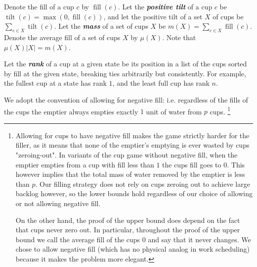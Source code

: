 \documentclass[twocolumn]{article}[10pt]
\newcommand{\defn}[1]{{\textit{\textbf{\boldmath #1}}}\xspace}
\DeclareMathOperator{\tilt}{\text{tilt}}
\DeclareMathOperator{\fil}{\text{fill}}
\begin{document}
Denote the fill of a cup $c$ by $\fil(c)$. Let the \defn{positive tilt} of a cup $c$ be
$\tilt(c) = \max(0, \fil(c))$, and let the positive tilt of a set $X$ of
cups be $\sum_{c\in X} \tilt(c)$. Let the \defn{mass} of a set of cups $X$
be $m(X) = \sum_{c\in X} \fil(c)$. Denote the average fill of a set of cups $X$
by $\mu(X)$. Note that $\mu(X) |X| = m(X)$.

Let the \defn{rank} of a cup at a given state be its position in a list of the
cups sorted by fill at the given state, breaking ties arbitrarily but
consistently. For example, the fullest cup at a state has rank $1$, and the
least full cup has rank $n$.

We adopt the convention of allowing for negative fill: i.e. regardless of the
fills of the cups the emptier always empties exactly $1$ unit of water from
$p$ cups. \footnote{
  Allowing for cups to have negative fill makes the game strictly harder for
  the filler, as it means that none of the emptier's emptying is ever wasted by
  cups "zeroing-out". In variants of the cup game without negative fill, when
  the emptier empties from a cup with fill less than $1$ the cups fill goes to
  $0$. This however implies that the total mass of water removed by the emptier
  is less than $p$. Our filling strategy does not rely on cups zeroing out to
  achieve large backlog however, so the lower bounds hold regardless of our
  choice of allowing or not allowing negative fill. 

  On the other hand, the proof of the upper bound does depend on the fact that
  cups never zero out. In particular, throughout the proof of the upper bound
  we call the average fill of the cups $0$ and say that it never changes. We
  chose to allow negative fill (which has no physical analog in work
  scheduling) because it makes the problem more elegant.
}
\end{document}
